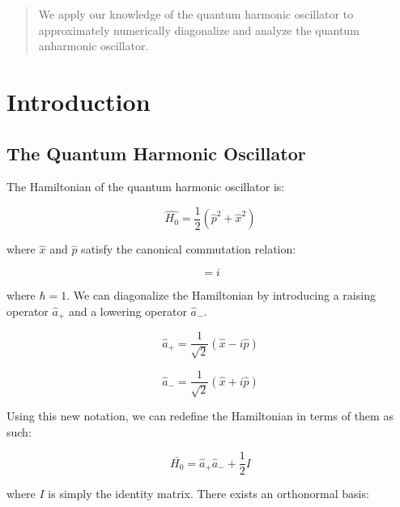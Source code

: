 \documentclass[12pt]{article}
\begin{document}
\maketitle

\begin{abstract}
We apply our knowledge of the quantum harmonic oscillator to approximately numerically diagonalize and analyze the quantum anharmonic oscillator.
\end{abstract}

\section{Introduction}

\subsection*{The Quantum Harmonic Oscillator}

The Hamiltonian of the quantum harmonic oscillator is:

\begin{equation}
\hat{H_0} = \frac{1}{2} ( \hat{p}^2 + \hat{x}^2 )
\end{equation}

where $\hat{x}$ and $\hat{p}$ satisfy the canonical commutation relation:

\begin{equation}
[ \hat{x} , \hat{p} ] = i
\end{equation}

where $\hbar = 1$. We can diagonalize the Hamiltonian by introducing a raising operator $\hat{a}_+$ and a lowering operator $\hat{a}_-$.

\begin{equation}
\hat{a}_+ = \frac{1}{\sqrt{2}} ( \hat{x} - i \hat{p} )
\end{equation}

\begin{equation}
\hat{a}_- = \frac{1}{\sqrt{2}} ( \hat{x} + i \hat{p} )
\end{equation}

Using this new notation, we can redefine the Hamiltonian in terms of them as such:

\begin{equation}
\bar{H_0} = \hat{a}_+ \hat{a}_- + \frac{1}{2} I
\end{equation}

where $I$ is simply the identity matrix. There exists an orthonormal basis:
\end{document}
